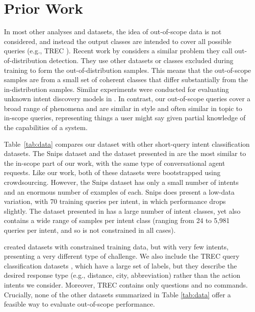 \documentclass[11pt,a4paper]{article}
\begin{document}
\section{Prior Work}
\begin{table}
\centering
\scalebox{1}{
}
\caption{\label{tab:data}
Classification dataset properties.
Ours has the broadest range of intents and specially collected out-of-scope queries. We consider ``chatbot style" queries to be short, possibly unstructured questions and commands.
}
\end{table}
In most other analyses and datasets, the idea of out-of-scope data is not considered, and instead the output classes are intended to cover all possible queries (e.g., TREC \citep{TREC}).
Recent work by \citet{hendrycks17baseline} considers a similar problem they call out-of-distribution detection.
They use other datasets or classes excluded during training to form the out-of-distribution samples.
This means that the out-of-scope samples are from a small set of coherent classes that differ substantially from the in-distribution samples.
Similar experiments were conducted for evaluating unknown intent discovery models in \citet{lin-xu-2019-deep}.
In contrast, our out-of-scope queries cover a broad range of phenomena and are similar in style and often similar in topic to in-scope queries, representing things a user might say given partial knowledge of the capabilities of a system.

Table~\ref{tab:data} compares our dataset with other short-query intent classification datasets.
The Snips \citep{snips} dataset and the dataset presented in \citet{sds-eval} are the most similar to the in-scope part of our work, with the same type of conversational agent requests.
Like our work, both of these datasets were bootstrapped using crowdsourcing.
However, the Snips dataset has only a small number of intents and an enormous number of examples of each.
Snips does present a low-data variation, with 70 training queries per intent, in which performance drops slightly.
The dataset presented in \citet{sds-eval} has a large number of intent classes, yet also contains a wide range of samples per intent class (ranging from 24 to 5,981 queries per intent, and so is not constrained in all cases).

\citet{cbc} created datasets with constrained training data, but with very few intents, presenting a very different type of challenge.
We also include the TREC query classification datasets \citep{TREC}, which have a large set of labels, but they describe the desired response type (e.g., distance, city, abbreviation) rather than the action intents we consider.
Moreover, TREC contains only questions and no commands.
Crucially, none of the other datasets summarized in Table \ref{tab:data} offer a feasible way to evaluate out-of-scope performance.
\end{document}
